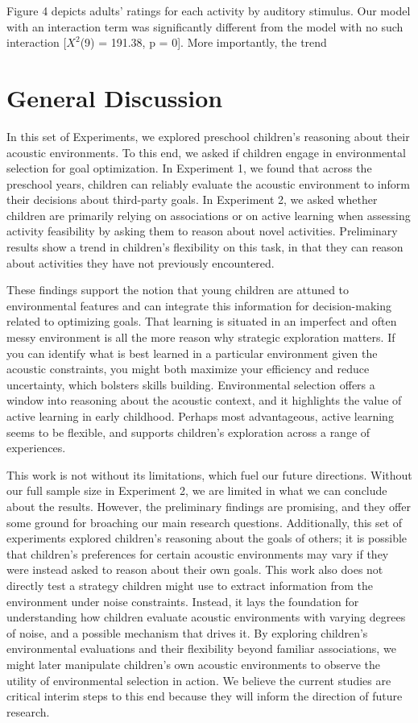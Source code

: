 \documentclass[10pt, letterpaper]{article}
\begin{document}
Figure 4 depicts adults' ratings for each activity by auditory stimulus.
Our model with an interaction term was significantly different from the
model with no such interaction {[}\(X^2\)(9) = 191.38, p = 0{]}. More
importantly, the trend

\hypertarget{general-discussion}{%
\section{General Discussion}\label{general-discussion}}

In this set of Experiments, we explored preschool children's reasoning
about their acoustic environments. To this end, we asked if children
engage in environmental selection for goal optimization. In Experiment
1, we found that across the preschool years, children can reliably
evaluate the acoustic environment to inform their decisions about
third-party goals. In Experiment 2, we asked whether children are
primarily relying on associations or on active learning when assessing
activity feasibility by asking them to reason about novel activities.
Preliminary results show a trend in children's flexibility on this task,
in that they can reason about activities they have not previously
encountered.

These findings support the notion that young children are attuned to
environmental features and can integrate this information for
decision-making related to optimizing goals. That learning is situated
in an imperfect and often messy environment is all the more reason why
strategic exploration matters. If you can identify what is best learned
in a particular environment given the acoustic constraints, you might
both maximize your efficiency and reduce uncertainty, which bolsters
skills building. Environmental selection offers a window into reasoning
about the acoustic context, and it highlights the value of active
learning in early childhood. Perhaps most advantageous, active learning
seems to be flexible, and supports children's exploration across a range
of experiences.

This work is not without its limitations, which fuel our future
directions. Without our full sample size in Experiment 2, we are limited
in what we can conclude about the results. However, the preliminary
findings are promising, and they offer some ground for broaching our
main research questions. Additionally, this set of experiments explored
children's reasoning about the goals of others; it is possible that
children's preferences for certain acoustic environments may vary if
they were instead asked to reason about their own goals. This work also
does not directly test a strategy children might use to extract
information from the environment under noise constraints. Instead, it
lays the foundation for understanding how children evaluate acoustic
environments with varying degrees of noise, and a possible mechanism
that drives it. By exploring children's environmental evaluations and
their flexibility beyond familiar associations, we might later
manipulate children's own acoustic environments to observe the utility
of environmental selection in action. We believe the current studies are
critical interim steps to this end because they will inform the
direction of future research.
\end{document}
